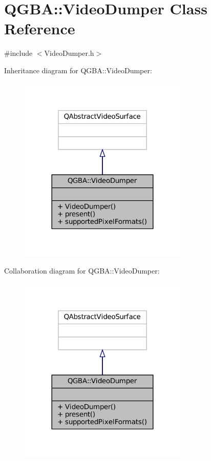 \hypertarget{class_q_g_b_a_1_1_video_dumper}{}\section{Q\+G\+BA\+:\+:Video\+Dumper Class Reference}
\label{class_q_g_b_a_1_1_video_dumper}


{\ttfamily \#include $<$Video\+Dumper.\+h$>$}



Inheritance diagram for Q\+G\+BA\+:\+:Video\+Dumper\+:
\nopagebreak
\begin{figure}[H]
\begin{center}
\leavevmode
\includegraphics[width=228pt]{class_q_g_b_a_1_1_video_dumper__inherit__graph}
\end{center}
\end{figure}


Collaboration diagram for Q\+G\+BA\+:\+:Video\+Dumper\+:
\nopagebreak
\begin{figure}[H]
\begin{center}
\leavevmode
\includegraphics[width=228pt]{class_q_g_b_a_1_1_video_dumper__coll__graph}
\end{center}
\end{figure}
